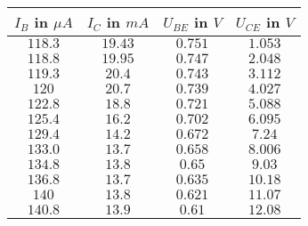 \begin{tabular}{c|c|c|c}
\(I_B\) in \(\mu A\) & \(I_C\) in \(mA\) & \(U_{BE}\) in \(V\) & \(U_{CE}\) in \(V\) \\ \hline
\( 118.3\) & \(19.43\) & \(0.751\) & \(1.053\) \\ 
\(118.8\) & \(19.95\) & \(0.747\) & \(2.048\) \\ 
\(119.3\) & \(20.4\) & \(0.743\) & \(3.112\) \\ 
\(120\) & \(20.7\) & \(0.739\) & \(4.027\) \\ 
\(122.8\) & \(18.8\) & \(0.721\) & \(5.088\) \\ 
\(125.4\) & \(16.2\) & \(0.702\) & \(6.095\) \\ 
\(129.4\) & \(14.2\) & \(0.672\) & \(7.24\) \\ 
\(133.0\) & \(13.7\) & \(0.658\) & \(8.006\) \\ 
\(134.8\) & \(13.8\) & \(0.65\) & \(9.03\) \\ 
\(136.8\) & \(13.7\) & \(0.635\) & \(10.18\) \\ 
\(140\) & \(13.8\) & \(0.621\) & \(11.07\) \\ 
\(140.8\) & \(13.9\) & \(0.61\) & \(12.08 \)
\end{tabular}